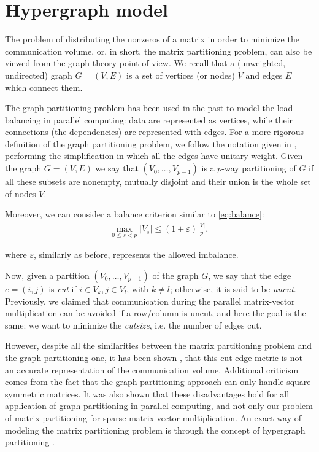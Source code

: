 \section{Hypergraph model}

The problem of distributing the nonzeros of a matrix in order to minimize the communication volume, or, in short, the matrix partitioning problem, can also be viewed from the graph theory point of view. We recall that a (unweighted, undirected) graph $G=(V,E)$ is a set of vertices (or nodes) $V$ and edges $E$ which connect them. 

The graph partitioning problem has been used in the past to model the load balancing in parallel computing: data are represented as vertices, while their connections (the dependencies) are represented with edges. For a more rigorous definition of the graph partitioning problem, we follow the notation given in \cite{hypergraph_model},  performing the simplification in which all the edges have unitary weight. Given the graph $G=(V,E)$ we say that $(V_0,\dots,V_{p-1})$ is a $p$-way partitioning of $G$ if all these subsets are nonempty, mutually disjoint and their union is the whole set of nodes $V$. 

Moreover, we can consider a balance criterion similar to \eqref{eq:balance}:
\begin{align}
	\max_{0\leq s <p}	|V_s| \leq (1+\varepsilon)\frac{|V|}{p},
	\label{eq:balance_hypergraph}
\end{align}

where $\varepsilon$, similarly as before, represents the allowed imbalance.

Now, given a partition $(V_0,\dots,V_{p-1})$ of the graph $G$, we say that the edge $e=(i,j)$ is \emph{cut} if $i \in V_k, j \in V_l$, with $k \neq l$; otherwise, it is said to be \emph{uncut}. Previously, we claimed that communication during the parallel matrix-vector multiplication can be avoided if a row/column is uncut, and here the goal is the same: we want to minimize the \emph{cutsize}, i.e. the number of edges cut.

However, despite all the similarities between the matrix partitioning problem and the graph partitioning one, it has been shown \cite{hypergraph_model}\cite{zoltan_worth-it},  that this cut-edge metric is not an accurate representation of the communication volume. Additional criticism \cite{hendrickson_emperor} comes from the fact that the graph partitioning approach can only handle square symmetric matrices. It was also shown \cite{hendrickson_kolda} that these disadvantages hold for all application of graph partitioning in parallel computing, and not only our problem of matrix partitioning for sparse matrix-vector multiplication. An exact way of modeling the matrix partitioning problem is through the concept of hypergraph partitioning \cite{hypergraph_model}.

